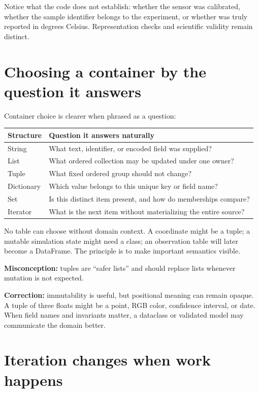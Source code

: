 Notice what the code does not establish: whether the sensor was calibrated,
whether the sample identifier belongs to the experiment, or whether
 was truly reported in degrees Celsius. Representation checks and
scientific validity remain distinct.

\section{Choosing a container by the question it answers}

Container choice is clearer when phrased as a question:

\begin{tabularx}{\textwidth}{@{}p{}X@{}}
\toprule
Structure & Question it answers naturally \\
\midrule
String & What text, identifier, or encoded field was supplied? \\
List & What ordered collection may be updated under one owner? \\
Tuple & What fixed ordered group should not change? \\
Dictionary & Which value belongs to this unique key or field name? \\
Set & Is this distinct item present, and how do memberships compare? \\
Iterator & What is the next item without materializing the entire source? \\
\bottomrule
\end{tabularx}

No table can choose without domain context. A coordinate might be a tuple; a
mutable simulation state might need a class; an observation table will later
become a DataFrame. The principle is to make important semantics visible.

\begin{misconceptionbox}
\textbf{Misconception:} tuples are ``safer lists'' and should replace lists
whenever mutation is not expected.

\textbf{Correction:} immutability is useful, but positional meaning can remain
opaque. A tuple of three floats might be a point, RGB color, confidence
interval, or date. When field names and invariants matter, a dataclass or
validated model may communicate the domain better.
\end{misconceptionbox}

\section{Iteration changes when work happens}

